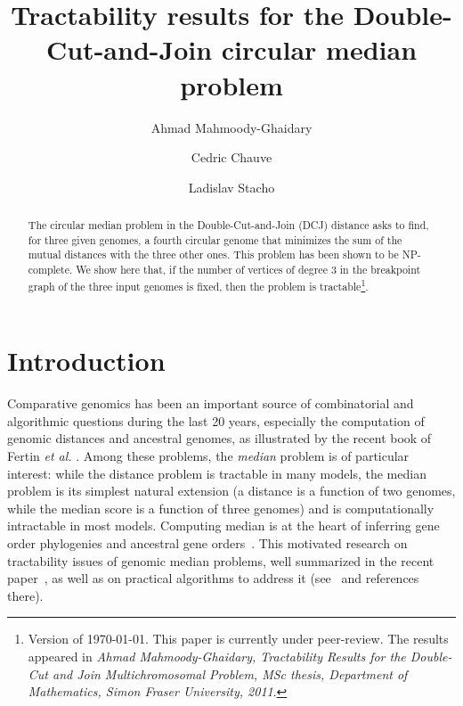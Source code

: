\documentclass[10pt]{llncs}
\title{Tractability results for the Double-Cut-and-Join circular
  median problem}
\author{
  Ahmad Mahmoody-Ghaidary \inst{1,2}
  \and
  Cedric Chauve \inst{1}
  \and
  Ladislav Stacho \inst{1}
}
\institute{Department of Mathematics, Simon Fraser University, Burnaby
  (BC), Canada
\and Department of Computer Science, Brown University, Providence (RI), USA}
\begin{document}
\maketitle



\begin{abstract}
  The circular median problem in the Dou\-ble-Cut-and-Join (DCJ)
  distance asks to find, for three given genomes, a fourth circular
  genome that minimizes the sum of the mutual distances with the three
  other ones. This problem has been shown to be NP-complete. We show
  here that, if the number of vertices of degree $3$ in the breakpoint
  graph of the three input genomes is fixed, then the problem is
  tractable\footnote{Version of \today. This paper is currently under
    peer-review. The results appeared in {\em Ahmad Mahmoody-Ghaidary,
      Tractability Results for the Double-Cut and Join
      Multichromosomal Problem, MSc thesis, Department of Mathematics,
      Simon Fraser University, 2011}.}.
\end{abstract}



\section{Introduction} \label{sec:intro}

Comparative genomics has been an important source of combinatorial and
algorithmic questions during the last 20 years, especially the
computation of genomic distances and ancestral genomes, as illustrated
by the recent book of Fertin {\em et al.}  \cite{Fertin2009}. Among
these problems, the {\em median} problem is of particular interest:
while the distance problem is tractable in many models, the median
problem is its simplest natural extension (a distance is a function of
two genomes, while the median score is a function of three genomes)
and is computationally intractable in most models. Computing median is
at the heart of inferring gene order phylogenies and ancestral gene
orders~\cite{Murphy2005,Lin2010,Xu2011}. This motivated research on
tractability issues of genomic median problems, well summarized in the
recent paper~\cite{Tannier2009}, as well as on practical algorithms to
address it (see~\cite{Xu2008,Zhang2009,Xu2009a,Xu2009b} and references
there).
\end{document}

